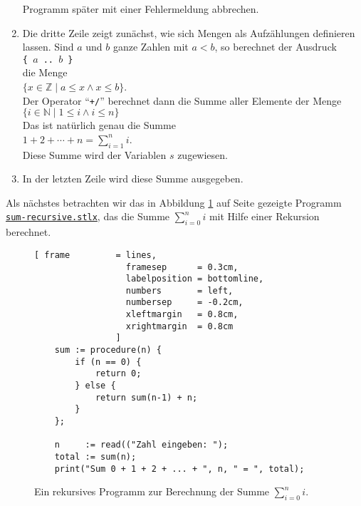 \begin{enumerate}
      Programm sp\"{a}ter mit einer Fehlermeldung abbrechen.
\item Die dritte Zeile zeigt zun\"{a}chst, wie sich Mengen als Aufz\"{a}hlungen definieren lassen.  Sind
      $a$ und $b$ ganze Zahlen mit $a < b$, so berechnet der Ausdruck
      \\[0.2cm]
      \hspace*{1.3cm}
      \texttt{\{ $a$ .. $b$ \}}
      \\[0.2cm]
      die Menge
      \\[0.2cm]
      \hspace*{1.3cm}
      $\{ x \in \mathbb{Z} \mid a \leq x \wedge x \leq b \}$.
      \\[0.2cm]
      Der Operator ``\texttt{+/}'' berechnet dann die Summe aller Elemente der Menge
      \\[0.2cm]
      \hspace*{1.3cm}
      $\{ i \in \mathbb{N} \mid 1 \leq i  \wedge i \leq n \}$
      \\[0.2cm]
      Das ist nat\"{u}rlich genau die Summe
      \\[0.2cm]
      \hspace*{1.3cm}
      $1 + 2 + \cdots + n = \sum\limits_{i=1}^n i$.
      \\[0.2cm]
      Diese Summe wird der Variablen $s$ zugewiesen.
\item In der letzten Zeile wird diese Summe ausgegeben.
\end{enumerate}
Als n\"{a}chstes betrachten wir das in Abbildung \ref{fig:sum-recursive.stlx} auf Seite
\pageref{fig:sum-recursive.stlx} gezeigte Programm 
\href{https://github.com/karlstroetmann/Logik/blob/master/SetlX/sum-recursive.stlx}{\texttt{sum-recursive.stlx}}, 
das die Summe $\sum\limits_{i=0}^n i$ mit Hilfe einer Rekursion berechnet.

\begin{figure}[!ht]
  \centering
\begin{Verbatim}[ frame         = lines, 
                  framesep      = 0.3cm, 
                  labelposition = bottomline,
                  numbers       = left,
                  numbersep     = -0.2cm,
                  xleftmargin   = 0.8cm,
                  xrightmargin  = 0.8cm
                ]
    sum := procedure(n) {
        if (n == 0) { 
            return 0;
        } else {
            return sum(n-1) + n;
        }
    };
    
    n     := read(("Zahl eingeben: "); 
    total := sum(n);
    print("Sum 0 + 1 + 2 + ... + ", n, " = ", total);
\end{Verbatim} 
\vspace*{-0.3cm}
  \caption{Ein rekursives Programm zur Berechnung der Summe $\sum\limits_{i=0}^ni$.}
  \label{fig:sum-recursive.stlx}
\end{figure} 

